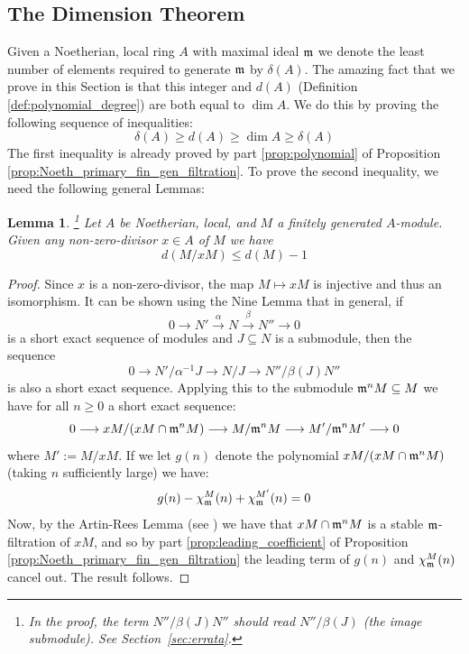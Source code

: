 \documentclass[12pt]{article}
\theoremstyle{plain}
\newtheorem{lemma}[thm]{Lemma}
\theoremstyle{definition}
\newcommand{\lto}{\longrightarrow}
\begin{document}
\subsection{The Dimension Theorem}
Given a Noetherian, local ring $A$ with maximal ideal $\frak{m}$ we denote the least number of elements required to generate $\frak{m}$ by $\delta(A)$. The amazing fact that we prove in this Section is that this integer and $d(A)$ (Definition \ref{def:polynomial_degree}) are both equal to $\operatorname{dim}A$. We do this by proving the following sequence of inequalities:
\[\delta(A) \geq d(A) \geq \operatorname{dim}A \geq \delta(A)\]
The first inequality is already proved by part \ref{prop:polynomial} of Proposition \ref{prop:Noeth_primary_fin_gen_filtration}. To prove the second inequality, we need the following general Lemmas:
\begin{lemma}
\label{lem:degree_modulo}\footnote{In the proof, the term $N''/\beta(J)N''$ should read $N''/\beta(J)$ (the image submodule). See Section~\ref{sec:errata}.}
Let $A$ be Noetherian, local, and $M$ a finitely generated $A$-module. Given any non-zero-divisor $x \in A$ of $M$ we have
\begin{equation}
    \label{eq:dimension_inductive_reduction} d(M/xM) \leq d(M) - 1
\end{equation}
\end{lemma}
\begin{proof}
Since $x$ is a non-zero-divisor, the map $M \longmapsto xM$ is injective and thus an isomorphism. It can be shown using the Nine Lemma that in general, if
\[0 \lto N' \stackrel{\alpha}{\lto} N \stackrel{\beta}{\lto} N'' \lto 0\]
is a short exact sequence of modules and $J \subseteq N$ is a submodule, then the sequence
\[0 \lto N'/\alpha^{-1}J \lto N/J \lto N''/\beta(J)N''\]
is also a short exact sequence. Applying this to the submodule $\frak{m}^nM \subseteq M$ we have for all $n \geq 0$ a short exact sequence:
\[0 \lto xM/(xM \cap \frak{m}^nM) \lto M/\frak{m}^nM \lto M'/\frak{m}^nM' \lto 0\]
where $M' := M/xM$. If we let $g(n)$ denote the polynomial $xM/(xM \cap \frak{m}^nM)$ (taking $n$ sufficiently large) we have:
\[g(n) - \chi_\frak{m}^M(n) + \chi_\frak{m}^{M'}(n) = 0\]
Now, by the Artin-Rees Lemma (see \cite{completion}) we have that $xM \cap \frak{m}^nM$ is a stable $\frak{m}$-filtration of $xM$, and so by part \ref{prop:leading_coefficient} of Proposition \ref{prop:Noeth_primary_fin_gen_filtration} the leading term of $g(n)$ and $\chi_\frak{m}^M(n)$ cancel out. The result follows.
\end{proof}
\end{document}
